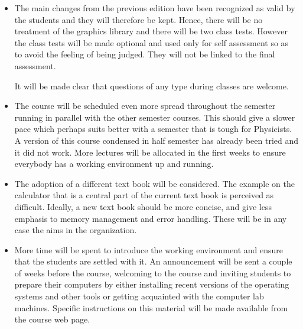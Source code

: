 \documentclass[11pt]{article}
\begin{document}
 \begin{itemize}
 \item The main changes from the previous edition have been recognized
   as valid by the students and they will therefore be kept. Hence,
   there will be no treatment of the graphics library and there will
   be two class tests. However the class tests will be made optional
   and used only for self assessment so as to avoid the feeling of
   being judged. They will not be linked to the final assessment.



  It will be made clear that questions of any type during classes are
  welcome.
 
   
 \item The course will be scheduled even more spread throughout the
   semester running in parallel with the other semester courses. This
   should give a slower pace which perhaps suits better with a semester
   that is tough for Physicists. A version of this course condensed in
   half semester has already been tried and it did not work. More
   lectures will be allocated in the first weeks to ensure everybody has
   a working environment up and running.

%   
%

 \item The adoption of a different text book will be considered. The
   example on the calculator that is a central part of the current text
   book is perceived as difficult.  Ideally, a new text book should be
   more concise, and give less emphasis to memory management and error
   handling. These will be in any case the aims in the organization.



 \item More time will be spent to introduce the working environment and
   ensure that the students are settled with it. An announcement will be
   sent a couple of weeks before the course, welcoming to the course and
   inviting students to prepare their computers by either installing
   recent versions of the operating systems and other tools or getting
   acquainted with the computer lab machines. Specific instructions on
   this material will be made available from the course web page.
   



\end{itemize}
\end{document}
